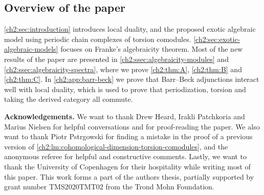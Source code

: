 \subsection*{Overview of the paper}

\cref{ch2:sec:introduction} introduces local duality, and the proposed exotic algebraic model using periodic chain complexes of torsion comodules. \cref{ch2:sec:exotic-algebraic-models} focuses on Franke's algebraicity theorem. Most of the new results of the paper are presented in \cref{ch2:ssec:algebraicity-modules} and \cref{ch2:ssec:algebraicity-spectra}, where we prove \cref{ch2:thm:A}, \cref{ch2:thm:B} and \cref{ch2:thm:C}. In \cref{ch2:app:barr-beck} we prove that Barr--Beck adjunctions interact well with local duality, which is used to prove that periodization, torsion and taking the derived category all commute. 


\textbf{Acknowledgements.} We want to thank Drew Heard, Irakli Patchkoria and Marius Nielsen for helpful conversations and for proof-reading the paper. We also want to thank Piotr Pstr\a{}gowski for finding a mistake in the proof of a previous version of \cref{ch2:lm:cohomological-dimension-torsion-comodules}, and the anonymous referee for helpful and constructive comments. Lastly, we want to thank the University of Copenhagen for their hospitality while writing most of this paper. This work forms a part of the authors thesis, partially supported by grant number TMS2020TMT02 from the Trond Mohn Foundation. 